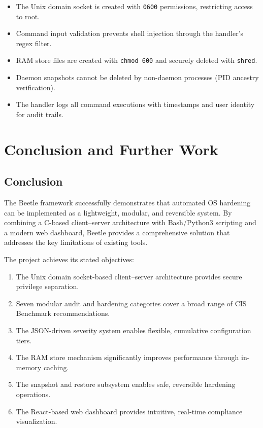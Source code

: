 \begin{itemize}[noitemsep]
    \item The Unix domain socket is created with \texttt{0600} permissions, restricting access to root.
    \item Command input validation prevents shell injection through the handler's regex filter.
    \item RAM store files are created with \texttt{chmod 600} and securely deleted with \texttt{shred}.
    \item Daemon snapshots cannot be deleted by non-daemon processes (PID ancestry verification).
    \item The handler logs all command executions with timestamps and user identity for audit trails.
\end{itemize}

\pagebreak
\section{Conclusion and Further Work}

\subsection{Conclusion}

The Beetle framework successfully demonstrates that automated OS hardening can be implemented as a lightweight, modular, and reversible system. By combining a C-based client--server architecture with Bash/Python3 scripting and a modern web dashboard, Beetle provides a comprehensive solution that addresses the key limitations of existing tools.

The project achieves its stated objectives:
\begin{enumerate}[noitemsep]
    \item The Unix domain socket-based client--server architecture provides secure privilege separation.
    \item Seven modular audit and hardening categories cover a broad range of CIS Benchmark recommendations.
    \item The JSON-driven severity system enables flexible, cumulative configuration tiers.
    \item The RAM store mechanism significantly improves performance through in-memory caching.
    \item The snapshot and restore subsystem enables safe, reversible hardening operations.
    \item The React-based web dashboard provides intuitive, real-time compliance visualization.
\end{enumerate}

